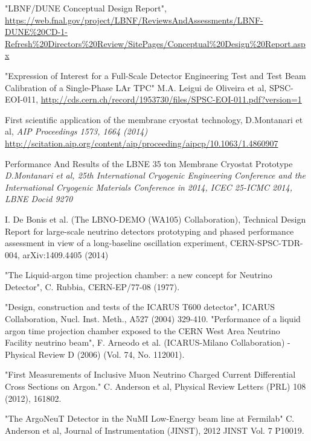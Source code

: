 \begin{thebibliography}{99}

%
%

%
%

 "LBNF/DUNE Conceptual Design Report",  \url{https://web.fnal.gov/project/LBNF/ReviewsAndAssessments/LBNF-DUNE\%20CD-1-Refresh\%20Directors\%20Review/SitePages/Conceptual\%20Design\%20Report.aspx}

 "Expression of Interest for a Full-Scale Detector Engineering Test and Test Beam Calibration of a Single-Phase LAr TPC" M.A. Leigui de Oliveira et al, SPSC-EOI-011, \url{http://cds.cern.ch/record/1953730/files/SPSC-EOI-011.pdf?version=1}

 First scientific application of the membrane cryostat technology, D.Montanari et al, \textit{AIP Proceedings 1573, 1664 (2014)} \url{http://scitation.aip.org/content/aip/proceeding/aipcp/10.1063/1.4860907}

  Performance And Results of the LBNE 35 ton Membrane Cryostat Prototype \textit{D.Montanari et al, 25th International Cryogenic Engineering Conference and the International Cryogenic Materials Conference in 2014, ICEC 25-ICMC 2014, LBNE Docid 9270} 

 I. De Bonis et al. (The LBNO-DEMO (WA105) Collaboration), Technical Design Report for large-scale neutrino detectors prototyping and phased performance assessment in view of a long-baseline oscillation experiment, CERN-SPSC-TDR-004, arXiv:1409.4405 (2014)

"The Liquid-argon time projection chamber: a new concept for Neutrino Detector", C. Rubbia, CERN-EP/77-08 (1977).

 "Design, construction and tests of the ICARUS T600 detector", ICARUS Collaboration, Nucl. Inst. Meth., A527 (2004) 329-410. 
"Performance of a liquid argon time projection chamber exposed to the CERN West Area Neutrino Facility neutrino beam", F. Arneodo et al. (ICARUS-Milano Collaboration) - Physical Review D (2006) (Vol. 74, No. 112001). 

 "First Measurements of Inclusive Muon Neutrino Charged Current Differential Cross Sections on Argon." C. Anderson et al, Physical Review Letters (PRL) 108 (2012), 161802. 

 "The ArgoNeuT Detector in the NuMI Low-Energy beam line at Fermilab" C. Anderson et al, Journal of Instrumentation (JINST), 2012 JINST Vol. 7 P10019. 


\end{thebibliography}
